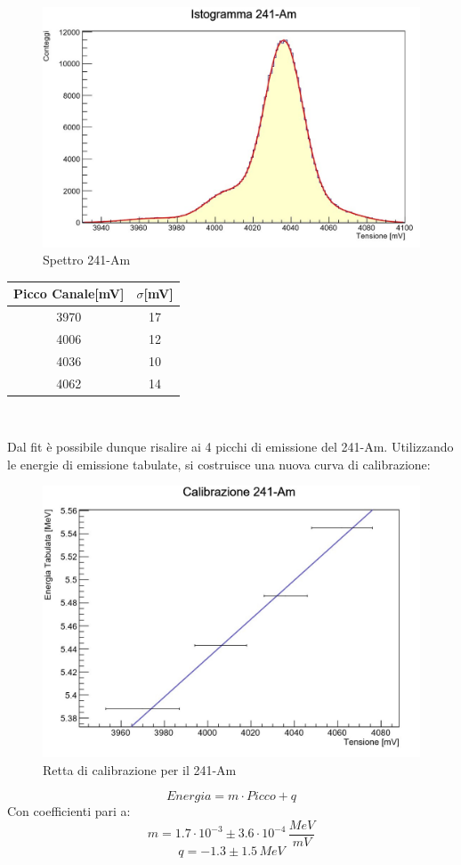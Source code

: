 \documentclass[a4paper,10pt]{article}
\begin{document}
\begin{figure}[h!]
    \centering
    \includegraphics[scale=0.7]{istoame.jpg}
    \caption{Spettro 241-Am}
\end{figure}

\begin{center}
    \begin{tabular}{cc}
        \toprule
        Picco Canale[mV] & $\sigma$[mV] \\
        \midrule
        3970 & 17\\
        4006 & 12\\
        4036 & 10\\
        4062 & 14\\
        \bottomrule
    \end{tabular}\\
\end{center}

\noindent Dal fit \`e possibile dunque risalire ai 4 picchi di emissione del 241-Am. Utilizzando le energie di emissione tabulate, si costruisce una nuova curva di calibrazione:

\begin{figure}[H]
    \centering
    \includegraphics[scale=0.7]{rettaame.jpg}
    \caption{Retta di calibrazione per il 241-Am}
\end{figure}
$$
    Energia = m \cdot Picco + q
$$
Con coefficienti pari a:
$$
    m = 1.7\cdot10^{-3} \pm 3.6\cdot10^{-4}\, \frac{MeV}{mV}
$$
$$
    q = - 1.3 \pm 1.5\, MeV
$$
\end{document}
